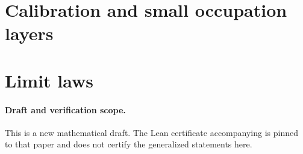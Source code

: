 \documentclass[11pt]{amsart}
\theoremstyle{plain}
\theoremstyle{definition}
\numberwithin{equation}{section}
\begin{document}


\section{Calibration and small occupation layers}

\section{Limit laws}




\paragraph{Draft and verification scope.}
This is a new mathematical draft. The Lean certificate accompanying
\cite{BouRabeePeres2026CERW} is pinned to that paper and does not certify
the generalized statements here.


\end{document}
